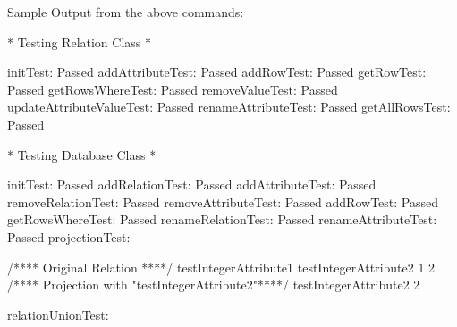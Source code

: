Sample Output from the above commands\-: 



\begin{DoxyPre}{\ttfamily 


* Testing Relation Class *



initTest:                  Passed
addAttributeTest:          Passed
addRowTest:                Passed
getRowTest:                Passed
getRowsWhereTest:          Passed
removeValueTest:           Passed
updateAttributeValueTest:  Passed
renameAttributeTest:       Passed
getAllRowsTest:            Passed}\end{DoxyPre}



\begin{DoxyPre}{\ttfamily 


* Testing Database Class *



initTest:              Passed
addRelationTest:       Passed
addAttributeTest:      Passed
removeRelationTest:    Passed
removeAttributeTest:   Passed
addRowTest:            Passed
getRowsWhereTest:      Passed
renameRelationTest:    Passed
renameAttributeTest:   Passed
projectionTest:        


}\end{DoxyPre}



\begin{DoxyPre}{\ttfamily /**** Original Relation ****/
testIntegerAttribute1  testIntegerAttribute2  
1                      2                      
/**** Projection with "testIntegerAttribute2"****/
testIntegerAttribute2  
2                      



relationUnionTest:}\end{DoxyPre}



